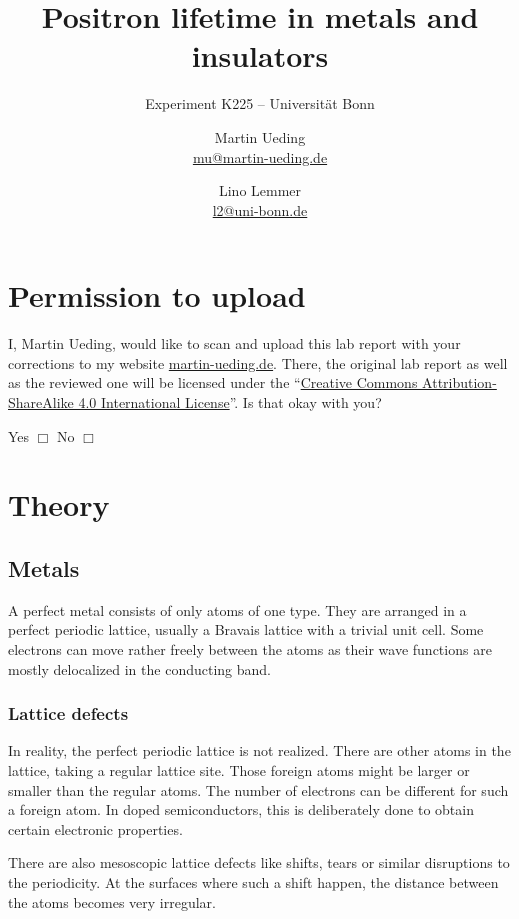 \documentclass[11pt, english, fleqn, DIV=15, headinclude, BCOR=2cm]{scrreprt}
\title{Positron lifetime in metals and insulators}
\subtitle{Experiment K225 -- Universität Bonn}
\author{%
    Martin Ueding \\
    \small{\href{mailto:mu@martin-ueding.de}{mu@martin-ueding.de}}
    \and
    Lino Lemmer \\
    \small{\href{mailto:l2@uni-bonn.de}{l2@uni-bonn.de}}
}
\date{\daterange{2016-03-24}{2016-03-25}}
\begin{document}
\maketitle

\begin{abstract}
\end{abstract}

\tableofcontents

\chapter*{Permission to upload}

I, Martin Ueding, would like to scan and upload this lab report with your
corrections to my website \href{http://martin-ueding.de}{martin-ueding.de}.
There, the original lab report as well as the reviewed one will be licensed
under the “\href{http://creativecommons.org/licenses/by-sa/4.0/}{Creative
Commons Attribution-ShareAlike 4.0 International License}”. Is that okay with
you?

Yes $\Box$ \hspace{2cm} No $\Box$

\chapter{Theory}

\section{Metals}

A perfect metal consists of only atoms of one type. They are arranged in a
perfect periodic lattice, usually a Bravais lattice with a trivial unit cell.
Some electrons can move rather freely between the atoms as their wave functions
are mostly delocalized in the conducting band.

\subsection{Lattice defects}

In reality, the perfect periodic lattice is not realized. There are other atoms
in the lattice, taking a regular lattice site. Those foreign atoms might be
larger or smaller than the regular atoms. The number of electrons can be
different for such a foreign atom. In doped semiconductors, this is
deliberately done to obtain certain electronic properties.

There are also mesoscopic lattice defects like shifts, tears or similar
disruptions to the periodicity. At the surfaces where such a shift happen,
the distance between the atoms becomes very irregular.
\end{document}
